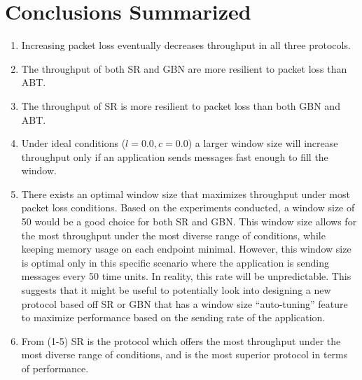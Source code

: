 \documentclass{article}
\begin{document}
\pagebreak

\section{Conclusions Summarized}
\begin{enumerate}
    \item Increasing packet loss eventually decreases throughput in all three protocols.
    \item The throughput of both SR and GBN are more resilient to packet loss than ABT.
    \item The throughput of SR is more resilient to packet loss than both GBN and ABT.
    \item Under ideal conditions ($l=0.0, c=0.0$) a larger window size will increase throughput only if an application sends messages fast enough to fill the window.
    \item There exists an optimal window size that maximizes throughput under most packet loss conditions. Based on the experiments conducted, a window size of 50 would be a good choice for both SR and GBN. This window size allows for the most throughput under the most diverse range of conditions, while keeping memory usage on each endpoint minimal. However, this window size is optimal only in this specific scenario where the application is sending messages every 50 time units. In reality, this rate will be unpredictable. This suggests that it might be useful to potentially look into designing a new protocol based off SR or GBN that has a window size ``auto-tuning'' feature to maximize performance based on the sending rate of the application.
    \item From (1-5) SR is the protocol which offers the most throughput under the most diverse range of conditions, and is the most superior protocol in terms of performance.
\end{enumerate}
\end{document}

